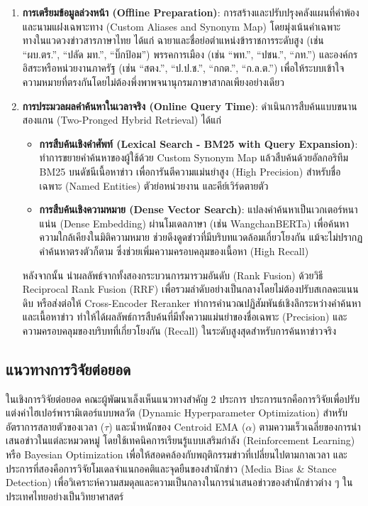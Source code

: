 \begin{enumerate}
    \item \textbf{การเตรียมข้อมูลล่วงหน้า (Offline Preparation)}: การสร้างและปรับปรุงคลังแผนที่คำพ้องและนามแฝงเฉพาะทาง (Custom Aliases and Synonym Map) โดยมุ่งเน้นคำเฉพาะทางในแวดวงข่าวสารภาษาไทย ได้แก่ ฉายาและชื่อย่อตำแหน่งข้าราชการระดับสูง (เช่น ``ผบ.ตร.'', ``ปลัด มท.'', ``บิ๊กป้อม'') พรรคการเมือง (เช่น ``พท.'', ``ปชน.'', ``ภท.'') และองค์กรอิสระหรือหน่วยงานภาครัฐ (เช่น ``สตง.'', ``ป.ป.ช.'', ``กกต.'', ``ก.ล.ต.'') เพื่อให้ระบบเข้าใจความหมายที่ตรงกันโดยไม่ต้องพึ่งพาพจนานุกรมภาษาสากลเพียงอย่างเดียว
    
    \item \textbf{การประมวลผลคำค้นหาในเวลาจริง (Online Query Time)}: ดำเนินการสืบค้นแบบขนานสองแกน (Two-Pronged Hybrid Retrieval) ได้แก่
    \begin{itemize}
        \item \textbf{การสืบค้นเชิงคำศัพท์ (Lexical Search - BM25 with Query Expansion)}: ทำการขยายคำค้นหาของผู้ใช้ด้วย Custom Synonym Map แล้วสืบค้นด้วยอัลกอริทึม BM25 บนดัชนีเนื้อหาข่าว เพื่อการันตีความแม่นยำสูง (High Precision) สำหรับชื่อเฉพาะ (Named Entities) ตัวย่อหน่วยงาน และคีย์เวิร์ดตายตัว
        \item \textbf{การสืบค้นเชิงความหมาย (Dense Vector Search)}: แปลงคำค้นหาเป็นเวกเตอร์หนาแน่น (Dense Embedding) ผ่านโมเดลภาษา (เช่น WangchanBERTa) เพื่อค้นหาความใกล้เคียงในมิติความหมาย ช่วยดึงดูดข่าวที่มีบริบทแวดล้อมเกี่ยวโยงกัน แม้จะไม่ปรากฏคำค้นหาตรงตัวก็ตาม ซึ่งช่วยเพิ่มความครอบคลุมของเนื้อหา (High Recall)
    \end{itemize}
    หลังจากนั้น นำผลลัพธ์จากทั้งสองกระบวนการมารวมอันดับ (Rank Fusion) ด้วยวิธี Reciprocal Rank Fusion (RRF) เพื่อรวมลำดับอย่างเป็นกลางโดยไม่ต้องปรับสเกลคะแนนดิบ หรือส่งต่อให้ Cross-Encoder Reranker ทำการคำนวณปฏิสัมพันธ์เชิงลึกระหว่างคำค้นหาและเนื้อหาข่าว ทำให้ได้ผลลัพธ์การสืบค้นที่มีทั้งความแม่นยำของชื่อเฉพาะ (Precision) และความครอบคลุมของบริบทที่เกี่ยวโยงกัน (Recall) ในระดับสูงสุดสำหรับการค้นหาข่าวจริง
\end{enumerate}

\subsection{แนวทางการวิจัยต่อยอด}

ในเชิงการวิจัยต่อยอด คณะผู้พัฒนาเล็งเห็นแนวทางสำคัญ 2 ประการ ประการแรกคือการวิจัยเพื่อปรับแต่งค่าไฮเปอร์พารามิเตอร์แบบพลวัต (Dynamic Hyperparameter Optimization) สำหรับอัตราการสลายตัวของเวลา ($\tau$) และน้ำหนักของ Centroid EMA ($\alpha$) ตามความเร็วเฉลี่ยของการนำเสนอข่าวในแต่ละหมวดหมู่ โดยใช้เทคนิคการเรียนรู้แบบเสริมกำลัง (Reinforcement Learning) หรือ Bayesian Optimization เพื่อให้สอดคล้องกับพฤติกรรมข่าวที่เปลี่ยนไปตามกาลเวลา และประการที่สองคือการวิจัยโมเดลจำแนกอคติและจุดยืนของสำนักข่าว (Media Bias \& Stance Detection) เพื่อวิเคราะห์ความสมดุลและความเป็นกลางในการนำเสนอข่าวของสำนักข่าวต่าง ๆ ในประเทศไทยอย่างเป็นวิทยาศาสตร์
